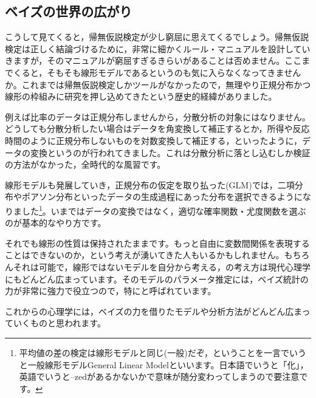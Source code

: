 \documentclass{ltjbook}
\begin{document}
\subsection{ベイズの世界の広がり}
こうして見てくると，帰無仮説検定が少し窮屈に思えてくるでしょう。帰無仮説検定は正しく結論づけるために，非常に細かくルール・マニュアルを設計していきますが，そのマニュアルが窮屈すぎるきらいがあることは否めません。ここまでくると，そもそも線形モデルであるというのも気に入らなくなってきませんか。これまでは帰無仮説検定しかツールがなかったので，無理やり正規分布かつ線形の枠組みに研究を押し込めてきたという歴史的経緯がありました。

例えば比率のデータは正規分布しませんから，分散分析の対象にはなりません。どうしても分散分析したい場合はデータを角変換して補正するとか，所得や反応時間のように正規分布しないものを対数変換して補正する，といったように，データの変換というのが行われてきました。これは分散分析に落とし込むしか検証の方法がなかった，全時代的な風習です。

線形モデルも発展していき，正規分布の仮定を取り払った(GLM)では，二項分布やポアソン分布といったデータの生成過程にあった分布を選択できるようになりました\footnote{平均値の差の検定は線形モデルと同じ(一般)だぞ，ということを一言でいうと一般線形モデルGeneral Linear Modelといいます。日本語でいうと「化」，英語でいうと--zedがあるかないかで意味が随分変わってしまうので要注意です。}。いまではデータの変換ではなく，適切な確率関数・尤度関数を選ぶのが基本的なやり方です。

それでも線形の性質は保持されたままです。もっと自由に変数間関係を表現することはできないのか，という考えが湧いてきた人もいるかもしれません。もちろんそれは可能で，線形ではないモデルを自分から考える，の考え方は現代心理学にもどんどん広まっています。そのモデルのパラメータ推定には，ベイズ統計の力が非常に強力で役立つので，特にと呼ばれています。

これからの心理学には，ベイズの力を借りたモデルや分析方法がどんどん広まっていくものと思われます。
\end{document}
